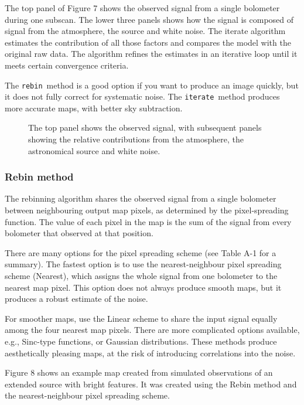 \documentclass[twoside,11pt]{article}
\newcommand{\xlabel}[1]{}
\renewcommand{\_}{\texttt{\symbol{95}}}
\newcommand{\rebin}{\texttt{rebin}}
\newcommand{\iterate}{\texttt{iterate}}
\begin{document}
The top panel of Figure 7 shows the observed signal from a single
bolometer during one subscan. The lower three panels shows how the
signal is composed of signal from the atmosphere, the source and white
noise. The iterate algorithm estimates the contribution of all those
factors and compares the model with the original raw data. The
algorithm refines the estimates in an iterative loop until it meets
certain convergence criteria.

The \rebin\ method is a good option if you want to produce an image
quickly, but it does not fully correct for systematic noise. The
\iterate\ method produces more accurate maps, with better sky
subtraction.

\begin{figure}
\caption{The top panel shows the observed signal, with subsequent
  panels showing the relative contributions from the atmosphere, the
  astronomical source and white noise.}
\end{figure}

\subsubsection{\xlabel{rebinmap}Rebin method\label{se:rebinmap}}

The rebinning algorithm shares the observed signal from a single
bolometer between neighbouring output map pixels, as determined by the
pixel-spreading function. The value of each pixel in the map is the
sum of the signal from every bolometer that observed at that position.

There are many options for the pixel spreading scheme (see Table A-1
for a summary). The fastest option is to use the nearest-neighbour
pixel spreading scheme (Nearest), which assigns the whole signal from
one bolometer to the nearest map pixel. This option does not always
produce smooth maps, but it produces a robust estimate of the noise.

For smoother maps, use the Linear scheme to share the input signal
equally among the four nearest map pixels. There are more complicated
options available, e.g., Sinc-type functions, or Gaussian
distributions. These methods produce aesthetically pleasing maps, at
the risk of introducing correlations into the noise.

Figure 8 shows an example map created from simulated observations of
an extended source with bright features. It was created using the
Rebin method and the nearest-neighbour pixel spreading scheme.
\end{document}
